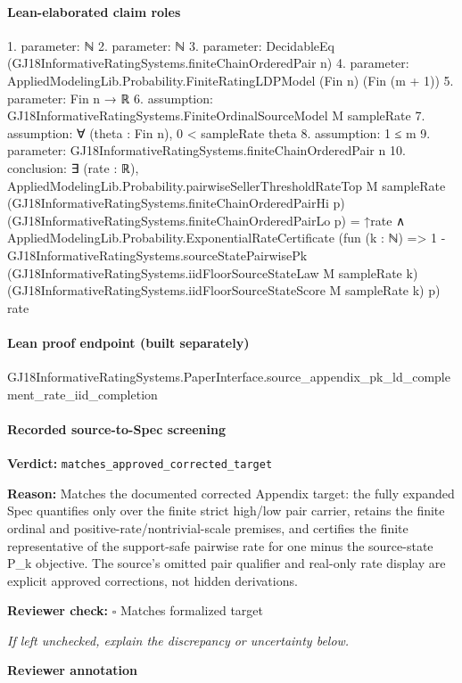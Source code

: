 \documentclass[10pt]{article}
\newcommand{\reviewerbox}{%
  \par\noindent\fbox{\parbox{0.96\linewidth}{\rule{0pt}{0.38in}}}\par
}
\newcommand{\reviewmatch}[1]{%
  \par\noindent\textbf{Reviewer check:} $\square$\; #1\par
  \noindent\emph{If left unchecked, explain the discrepancy or uncertainty below.}\par
}
\begin{document}
\paragraph{Lean-elaborated claim roles}\begin{ReviewVerbatim}
1. parameter: ℕ
2. parameter: ℕ
3. parameter: DecidableEq (GJ18InformativeRatingSystems.finiteChainOrderedPair n)
4. parameter: AppliedModelingLib.Probability.FiniteRatingLDPModel (Fin n) (Fin (m + 1))
5. parameter: Fin n → ℝ
6. assumption: GJ18InformativeRatingSystems.FiniteOrdinalSourceModel M sampleRate
7. assumption: ∀ (theta : Fin n), 0 < sampleRate theta
8. assumption: 1 ≤ m
9. parameter: GJ18InformativeRatingSystems.finiteChainOrderedPair n
10. conclusion: ∃ (rate : ℝ),
  AppliedModelingLib.Probability.pairwiseSellerThresholdRateTop M sampleRate
        (GJ18InformativeRatingSystems.finiteChainOrderedPairHi p)
        (GJ18InformativeRatingSystems.finiteChainOrderedPairLo p) =
      ↑rate ∧
    AppliedModelingLib.Probability.ExponentialRateCertificate
      (fun (k : ℕ) =>
        1 -
          GJ18InformativeRatingSystems.sourceStatePairwisePk
            (GJ18InformativeRatingSystems.iidFloorSourceStateLaw M sampleRate k)
            (GJ18InformativeRatingSystems.iidFloorSourceStateScore M sampleRate k) p)
      rate
\end{ReviewVerbatim}

\paragraph{Lean proof endpoint (built separately)}\begin{ReviewVerbatim}
GJ18InformativeRatingSystems.PaperInterface.source_appendix_pk_ld_complement_rate_iid_completion
\end{ReviewVerbatim}

\paragraph{Recorded source-to-Spec screening}
\textbf{Verdict:} \texttt{matches\_approved\_corrected\_target}
\\
{\raggedright
\textbf{Reason:} Matches the documented corrected Appendix target:\allowbreak{} the fully expanded Spec quantifies only over the finite strict high/\allowbreak{}low pair carrier, retains the finite ordinal and positive-\allowbreak{}rate/\allowbreak{}nontrivial-\allowbreak{}scale premises, and certifies the finite representative of the support-\allowbreak{}safe pairwise rate for one minus the source-\allowbreak{}state P\_\allowbreak{}k objective.\allowbreak{} The source's omitted pair qualifier and real-\allowbreak{}only rate display are explicit approved corrections, not hidden derivations.\allowbreak{}
\par}
\reviewmatch{Matches formalized target}
\noindent\textbf{Reviewer annotation}\par
\reviewerbox
\clearpage
\hypertarget{source-claim-7415d8df252dd9e8}{}
\end{document}
